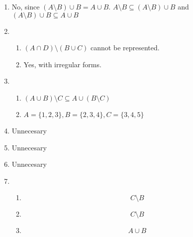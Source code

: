 \begin{enumerate}
    \item
    No, since \((A \setminus B) \cup B = A \cup B\).
    \(A \setminus B \subseteq (A \setminus B) \cup B\) and \((A \setminus B) \cup B  \subseteq A \cup B\)
    \item 
    \begin{enumerate}
        \item \((A \cap D) \setminus (B \cup C)\) cannot be represented.
        \item Yes, with irregular forms.
    \end{enumerate}
    \item
    \begin{enumerate}
        \item \((A \cup B) \setminus C \subseteq A \cup (B \setminus C)\)
        \item \(A = \{1,2,3\}, B = \{2,3,4\}, C=\{3,4,5\}\)
    \end{enumerate}
    \item Unnecesary
    \item Unnecesary
    \item  Unnecesary
    \item \begin{enumerate}
        \item \[C \setminus B\]
        \item \[C \setminus B\]
        \item \[A \cup B\]
    \end{enumerate}

\end{enumerate}
